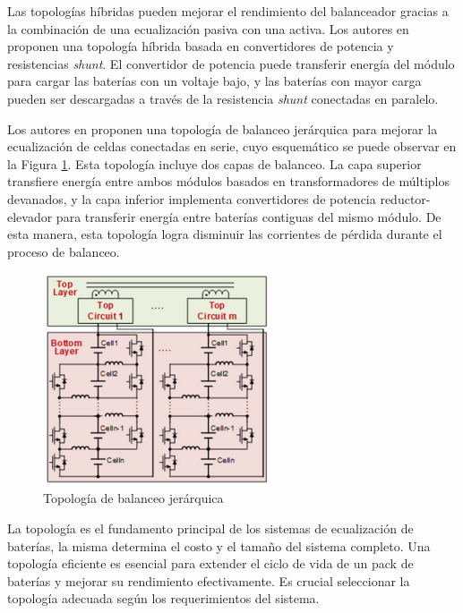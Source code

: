 \documentclass[10pt,a4paper]{article}
\newcounter{subsubsubsection}[subsubsection]
\begin{document}
Las topolog\'ias h\'ibridas pueden mejorar el rendimiento del balanceador
gracias a la combinaci\'on de una ecualizaci\'on pasiva con una activa. 
Los autores en \cite{fang_bal} proponen una topolog\'ia h\'ibrida basada en 
convertidores de potencia y resistencias \emph{shunt}. El convertidor de 
potencia puede transferir energ\'ia del m\'odulo para cargar las bater\'ias con 
un voltaje bajo, y las bater\'ias con mayor carga pueden ser descargadas a 
trav\'es de la resistencia \emph{shunt} conectadas en paralelo.

Los autores en \cite{zhang_et_al_hier} proponen una topolog\'ia de balanceo 
jer\'arquica para mejorar la ecualizaci\'on de celdas conectadas en serie, cuyo 
esquem\'atico se puede observar en la Figura \ref{hier_bal_top}. Esta 
topolog\'ia incluye dos capas de balanceo. La capa superior transfiere energ\'ia 
entre ambos m\'odulos basados en transformadores de m\'ultiplos devanados, y la 
capa inferior implementa convertidores de potencia reductor-elevador para 
transferir energ\'ia entre bater\'ias contiguas del mismo m\'odulo. De esta 
manera, esta topolog\'ia logra disminuir las corrientes de p\'erdida durante el 
proceso de balanceo.

\begin{figure}[h!]
    \begin{center}
        \includegraphics[width=0.6\textwidth]{hbbc_top.png}
        \caption{Topolog\'ia de balanceo jer\'arquica}
        \label{hier_bal_top}
    \end{center}
\end{figure}


La topolog\'ia es el fundamento principal de los sistemas de ecualizaci\'on de
bater\'ias, la misma determina el costo y el tamaño del sistema completo. Una
topolog\'ia eficiente es esencial para extender el ciclo de vida de un pack de
bater\'ias y mejorar su rendimiento efectivamente. Es crucial seleccionar la
topolog\'ia adecuada seg\'un los requerimientos del sistema. 
\end{document}

